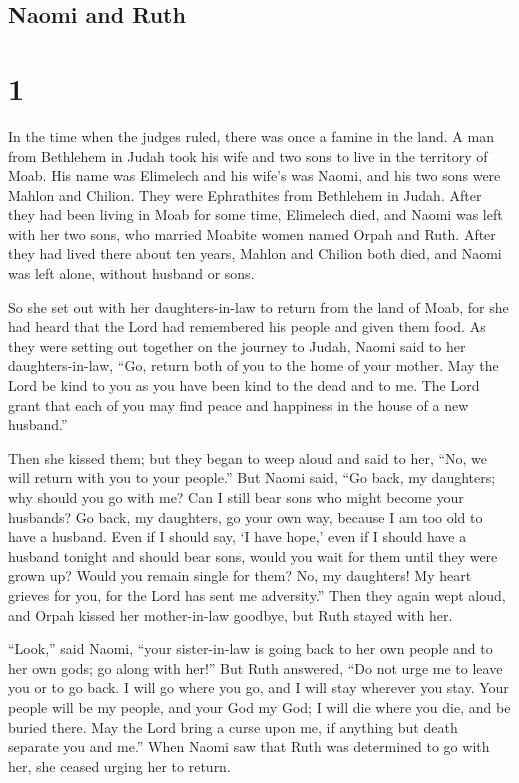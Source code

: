 \hypertarget{naomi-and-ruth}{%
\subsection{Naomi and Ruth}\label{naomi-and-ruth}}

\hypertarget{section}{%
\section{1}\label{section}}

 In the time when the judges ruled, there was once a famine
in the land. A man from Bethlehem in Judah took his wife and two sons to
live in the territory of Moab.  His name was Elimelech and
his wife's was Naomi, and his two sons were Mahlon and Chilion. They
were Ephrathites from Bethlehem in Judah. After they had been living in
Moab for some time,  Elimelech died, and Naomi was left with
her two sons,  who married Moabite women named Orpah and
Ruth. After they had lived there about ten years,  Mahlon
and Chilion both died, and Naomi was left alone, without husband or
sons.

 So she set out with her daughters-in-law to return from the
land of Moab, for she had heard that the Lord had remembered his people
and given them food.  As they were setting out together on
the journey to Judah,  Naomi said to her daughters-in-law,
``Go, return both of you to the home of your mother. May the Lord be
kind to you as you have been kind to the dead and to me. 
The Lord grant that each of you may find peace and happiness in the
house of a new husband.''

Then she kissed them; but they began to weep aloud  and
said to her, ``No, we will return with you to your people.''
 But Naomi said, ``Go back, my daughters; why should you go
with me? Can I still bear sons who might become your husbands?
 Go back, my daughters, go your own way, because I am too
old to have a husband. Even if I should say, `I have hope,' even if I
should have a husband tonight and should bear sons,  would
you wait for them until they were grown up? Would you remain single for
them? No, my daughters! My heart grieves for you, for the Lord has sent
me adversity.''  Then they again wept aloud, and Orpah
kissed her mother-in-law goodbye, but Ruth stayed with her.

 ``Look,'' said Naomi, ``your sister-in-law is going back
to her own people and to her own gods; go along with her!''
 But Ruth answered, ``Do not urge me to leave you or to go
back. I will go where you go, and I will stay wherever you stay. Your
people will be my people, and your God my God;  I will die
where you die, and be buried there. May the Lord bring a curse upon me,
if anything but death separate you and me.''  When Naomi
saw that Ruth was determined to go with her, she ceased urging her to
return.

